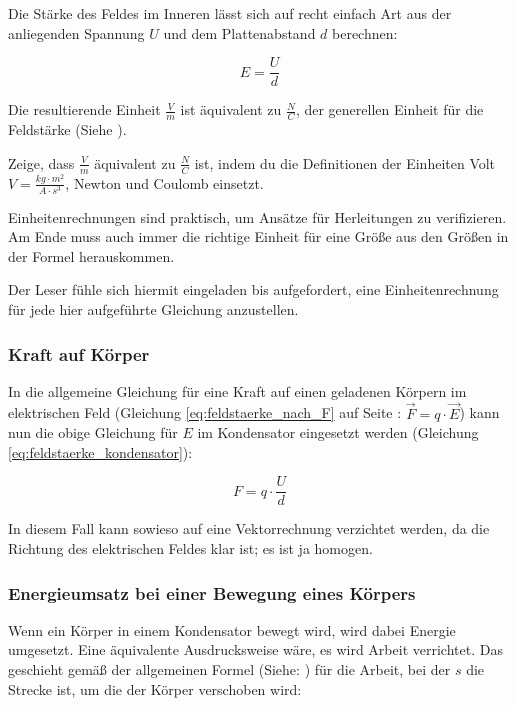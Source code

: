 Die Stärke des Feldes im Inneren lässt sich auf recht einfach Art aus der anliegenden Spannung $U$ und dem Plattenabstand $d$ berechnen:

\begin{equation} \label{eq:feldstaerke_kondensator}
	E = \frac{U}{d}
\end{equation}

Die resultierende Einheit $\frac{V}{m}$ ist äquivalent zu $\frac{N}{C}$, der generellen Einheit für die Feldstärke (Siehe ).

\begin{Aufgabe}
Zeige, dass $\frac{V}{m}$ äquivalent zu $\frac{N}{C}$ ist, indem du die Definitionen der Einheiten Volt $V=\frac{kg \cdot m^2}{A \cdot s^3}$, Newton und Coulomb einsetzt.

Einheitenrechnungen sind praktisch, um Ansätze für Herleitungen zu verifizieren. Am Ende muss auch immer die richtige Einheit für eine Größe aus den Größen in der Formel herauskommen.

Der Leser fühle sich hiermit eingeladen bis aufgefordert, eine Einheitenrechnung für jede hier aufgeführte Gleichung anzustellen. 
\end{Aufgabe}

\subsubsection{Kraft auf Körper}

In die allgemeine Gleichung für eine Kraft auf einen geladenen Körpern im elektrischen Feld (Gleichung \ref{eq:feldstaerke_nach_F} auf Seite \pageref{eq:feldstaerke_nach_F}: $\vec{F} = q \cdot \vec{E}$) kann nun die obige Gleichung für $E$ im Kondensator eingesetzt werden (Gleichung \ref{eq:feldstaerke_kondensator}):

\begin{equation} \label{eq:kraft_kondensator}
	F = q \cdot \frac{U}{d}
\end{equation}

In diesem Fall kann sowieso auf eine Vektorrechnung verzichtet werden, da die Richtung des elektrischen Feldes klar ist; es ist ja homogen.

\subsubsection{Energieumsatz bei einer Bewegung eines Körpers}

Wenn ein Körper in einem Kondensator bewegt wird, wird dabei Energie umgesetzt. Eine äquivalente Ausdrucksweise wäre, es wird \glqq Arbeit verrichtet\grqq . Das geschieht gemäß der allgemeinen Formel (Siehe: ) für die Arbeit, bei der $s$ die Strecke ist, um die der Körper verschoben wird:

